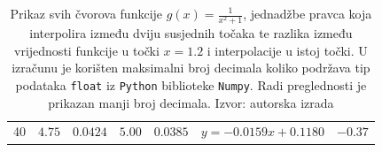 \documentclass[12pt,a4paper]{report}
\begin{document}
\begin{table}
\begin{center}
\begin{tabular}{c | cc|cc|c|c}
			40 &$4.75$&$0.0424$&$5.00$&$0.0385$&$y = -0.0159x+0.1180$&$-0.37$\\
		\end{tabular}
	\end{center}
	\caption{
		Prikaz svih čvorova funkcije $g(x)=\frac{1}{x^2 +1}$, jednadžbe pravca koja interpolira između dviju susjednih točaka te razlika između vrijednosti funkcije u točki $x=1.2$ i interpolacije u istoj točki. U izračunu je korišten maksimalni broj decimala koliko podržava tip podataka \texttt{float} iz \texttt{Python} biblioteke \texttt{Numpy}. Radi preglednosti je prikazan manji broj decimala. Izvor: autorska izrada}
	\label{linInterpolTablicaDva}
\end{table}
\end{document}
